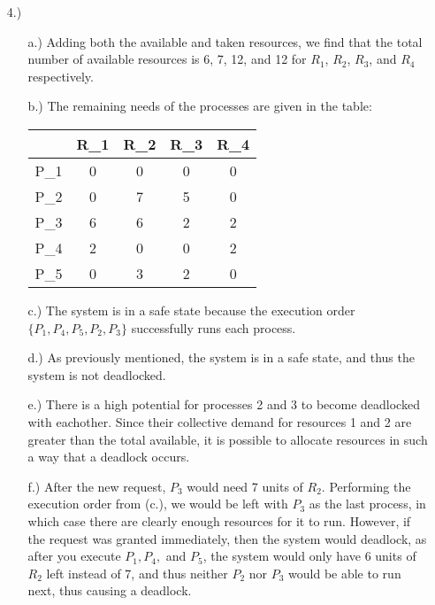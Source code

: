 \documentclass[12pt]{article}
\begin{document}
\begin{itemize}
        \pagebreak
        \item [4.)] \begin{itemize}
            \item [a.)] Adding both the available and taken resources, we find
                that the total number of available resources is 6, 7, 12, and 12
                for \( R_1 \), \( R_2 \), \( R_3 \), and \( R_4 \) respectively.

            \item [b.)] The remaining needs of the processes are given in the table:
                \begin{center}
                    \begin{tabular}{c|c|c|c|c}
                        & R_1 & R_2 & R_3 & R_4 \\
                        \hline
                        P_1 & 0 & 0 & 0 & 0 \\
                        P_2 & 0 & 7 & 5 & 0 \\
                        P_3 & 6 & 6 & 2 & 2 \\
                        P_4 & 2 & 0 & 0 & 2 \\
                        P_5 & 0 & 3 & 2 & 0 \\
                    \end{tabular}
                \end{center}

            \item [c.)] The system is in a safe state because the execution order
                \( \{ P_1,P_4,P_5,P_2,P_3 \} \) successfully runs each process.

            \item [d.)] As previously mentioned, the system is in a safe state, and thus
                the system is not deadlocked.

            \item [e.)] There is a high potential for processes 2 and 3 to become deadlocked
                with eachother. Since their collective demand for resources 1 and 2 are
                greater than the total available, it is possible to allocate resources in
                such a way that a deadlock occurs.

            \item [f.)] After the new request, \( P_3 \) would need 7 units of \( R_2 \).
                Performing the execution order from (c.), we would be left with \( P_3 \)
                as the last process, in which case there are clearly enough resources for
                it to run.
                However, if the request was granted immediately, then the system would
                deadlock, as after you execute \( P_1, P_4, \) and \( P_5 \), the system
                would only have 6 units of \( R_2 \) left instead of 7, and thus neither
                \( P_2 \) nor \( P_3 \) would be able to run next, thus causing a
                deadlock.
        \end{itemize}


\end{itemize}
\end{document}
